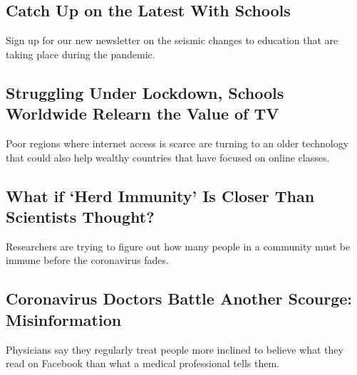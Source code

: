\href{/2020/08/17/us/k-12-schools-reopening.html}{}

\hypertarget{catch-up-on-the-latest-with-schools}{%
\subsection{Catch Up on the Latest With
Schools}\label{catch-up-on-the-latest-with-schools}}

Sign up for our new newsletter on the seismic changes to education that
are taking place during the pandemic.

\href{/2020/08/17/world/coronavirus-television-schools.html}{}

\hypertarget{struggling-under-lockdown-schools-worldwide-relearn-the-value-of-tv}{%
\subsection{Struggling Under Lockdown, Schools Worldwide Relearn the
Value of
TV}\label{struggling-under-lockdown-schools-worldwide-relearn-the-value-of-tv}}

Poor regions where internet access is scarce are turning to an older
technology that could also help wealthy countries that have focused on
online classes.

\href{/2020/08/17/health/coronavirus-herd-immunity.html}{}

\hypertarget{what-if-herd-immunity-is-closer-than-scientists-thought}{%
\subsection{What if `Herd Immunity' Is Closer Than Scientists
Thought?}\label{what-if-herd-immunity-is-closer-than-scientists-thought}}

Researchers are trying to figure out how many people in a community must
be immune before the coronavirus fades.

\href{/2020/08/17/technology/coronavirus-disinformation-doctors.html}{}

\hypertarget{coronavirus-doctors-battle-another-scourge-misinformation}{%
\subsection{Coronavirus Doctors Battle Another Scourge:
Misinformation}\label{coronavirus-doctors-battle-another-scourge-misinformation}}

Physicians say they regularly treat people more inclined to believe what
they read on Facebook than what a medical professional tells them.

